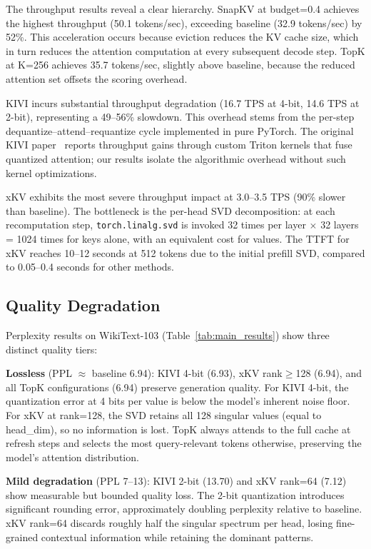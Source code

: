 \documentclass[conference]{IEEEtran}
\begin{document}
The throughput results reveal a clear hierarchy. SnapKV at budget=0.4 achieves the highest throughput (50.1 tokens/sec), exceeding baseline (32.9 tokens/sec) by 52\%. This acceleration occurs because eviction reduces the KV cache size, which in turn reduces the attention computation at every subsequent decode step. TopK at K=256 achieves 35.7 tokens/sec, slightly above baseline, because the reduced attention set offsets the scoring overhead.

KIVI incurs substantial throughput degradation (16.7 TPS at 4-bit, 14.6 TPS at 2-bit), representing a 49--56\% slowdown. This overhead stems from the per-step dequantize--attend--requantize cycle implemented in pure PyTorch. The original KIVI paper~\cite{kivi} reports throughput gains through custom Triton kernels that fuse quantized attention; our results isolate the algorithmic overhead without such kernel optimizations.

xKV exhibits the most severe throughput impact at 3.0--3.5 TPS (90\% slower than baseline). The bottleneck is the per-head SVD decomposition: at each recomputation step, \texttt{torch.linalg.svd} is invoked 32 times per layer $\times$ 32 layers = 1024 times for keys alone, with an equivalent cost for values. The TTFT for xKV reaches 10--12 seconds at 512 tokens due to the initial prefill SVD, compared to 0.05--0.4 seconds for other methods.

\subsection{Quality Degradation}

Perplexity results on WikiText-103 (Table~\ref{tab:main_results}) show three distinct quality tiers:

\textbf{Lossless} (PPL $\approx$ baseline 6.94): KIVI 4-bit (6.93), xKV rank$\geq$128 (6.94), and all TopK configurations (6.94) preserve generation quality. For KIVI 4-bit, the quantization error at 4 bits per value is below the model's inherent noise floor. For xKV at rank=128, the SVD retains all 128 singular values (equal to head\_dim), so no information is lost. TopK always attends to the full cache at refresh steps and selects the most query-relevant tokens otherwise, preserving the model's attention distribution.

\textbf{Mild degradation} (PPL 7--13): KIVI 2-bit (13.70) and xKV rank=64 (7.12) show measurable but bounded quality loss. The 2-bit quantization introduces significant rounding error, approximately doubling perplexity relative to baseline. xKV rank=64 discards roughly half the singular spectrum per head, losing fine-grained contextual information while retaining the dominant patterns.
\end{document}
